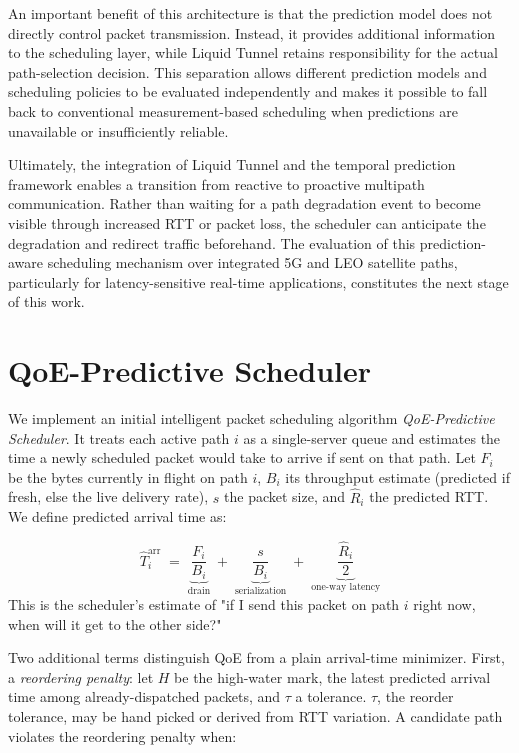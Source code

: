\documentclass[sigconf,nonacm]{acmart}
\begin{document}
An important benefit of this architecture is that the prediction model does not directly control packet transmission. Instead, it provides additional information to the scheduling layer, while Liquid Tunnel retains responsibility for the actual path-selection decision. This separation allows different prediction models and scheduling policies to be evaluated independently and makes it possible to fall back to conventional measurement-based scheduling when predictions are unavailable or insufficiently reliable.

Ultimately, the integration of Liquid Tunnel and the temporal prediction framework enables a transition from reactive to proactive multipath communication. Rather than waiting for a path degradation event to become visible through increased RTT or packet loss, the scheduler can anticipate the degradation and redirect traffic beforehand. The evaluation of this prediction-aware scheduling mechanism over integrated 5G and LEO satellite paths, particularly for latency-sensitive real-time applications, constitutes the next stage of this work.

\section{QoE-Predictive Scheduler}
\label{sec:qoe_scheduler}

We implement an initial intelligent packet scheduling algorithm \textit{QoE-Predictive Scheduler}. It treats each active path $i$ as a single-server queue and estimates the time a newly scheduled packet would take to arrive if sent on that path. Let $F_i$ be the bytes currently in flight on path $i$, $B_i$ its throughput estimate (predicted if fresh, else the live delivery rate), $s$ the packet size, and $\hat{R}_i$ the predicted RTT. We define predicted arrival time as:

\begin{equation}
    \hat{T}_i^{\text{arr}} \;=\; \underbrace{\frac{F_i}{B_i}}_{\text{drain}}
    \;+\; \underbrace{\frac{s}{B_i}}_{\text{serialization}}
    \;+\; \underbrace{\frac{\hat{R}_i}{2}}_{\text{one-way latency}}
    \label{eq:arrival}
\end{equation}
This is the scheduler's estimate of "if I send this packet on path $i$ right now, when will it get to the other side?"

Two additional terms distinguish QoE from a plain arrival-time minimizer. First, a \emph{reordering penalty}: let $H$ be the high-water mark, the latest predicted arrival time among already-dispatched packets,
and $\tau$ a tolerance. $\tau$, the reorder tolerance, may be hand picked or derived from RTT variation.
A candidate path violates the reordering penalty when:
\end{document}
